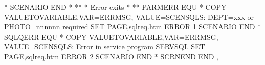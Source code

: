 \documentclass[letterpaper,10pt,english]{sphinxmanual}
\begin{document}
\begin{sphinxVerbatim}[commandchars=\\\{\}]
*
   SCENARIO END
*
*\PYGZhy{}\PYGZhy{}\PYGZhy{}\PYGZhy{}\PYGZhy{}\PYGZhy{}\PYGZhy{}\PYGZhy{}\PYGZhy{}\PYGZhy{}\PYGZhy{}\PYGZhy{}\PYGZhy{}\PYGZhy{}\PYGZhy{}\PYGZhy{}\PYGZhy{}\PYGZhy{}\PYGZhy{}\PYGZhy{}\PYGZhy{}\PYGZhy{}\PYGZhy{}\PYGZhy{}\PYGZhy{}\PYGZhy{}\PYGZhy{}\PYGZhy{}\PYGZhy{}\PYGZhy{}\PYGZhy{}\PYGZhy{}\PYGZhy{}\PYGZhy{}\PYGZhy{}\PYGZhy{}\PYGZhy{}\PYGZhy{}\PYGZhy{}\PYGZhy{}\PYGZhy{}\PYGZhy{}\PYGZhy{}\PYGZhy{}\PYGZhy{}\PYGZhy{}\PYGZhy{}\PYGZhy{}\PYGZhy{}\PYGZhy{}\PYGZhy{}\PYGZhy{}\PYGZhy{}\PYGZhy{}\PYGZhy{}\PYGZhy{}\PYGZhy{}\PYGZhy{}\PYGZhy{}\PYGZhy{}\PYGZhy{}\PYGZhy{}\PYGZhy{}\PYGZhy{}\PYGZhy{}\PYGZhy{}\PYGZhy{}\PYGZhy{}\PYGZhy{}*
* Error exits                                                         *
*\PYGZhy{}\PYGZhy{}\PYGZhy{}\PYGZhy{}\PYGZhy{}\PYGZhy{}\PYGZhy{}\PYGZhy{}\PYGZhy{}\PYGZhy{}\PYGZhy{}\PYGZhy{}\PYGZhy{}\PYGZhy{}\PYGZhy{}\PYGZhy{}\PYGZhy{}\PYGZhy{}\PYGZhy{}\PYGZhy{}\PYGZhy{}\PYGZhy{}\PYGZhy{}\PYGZhy{}\PYGZhy{}\PYGZhy{}\PYGZhy{}\PYGZhy{}\PYGZhy{}\PYGZhy{}\PYGZhy{}\PYGZhy{}\PYGZhy{}\PYGZhy{}\PYGZhy{}\PYGZhy{}\PYGZhy{}\PYGZhy{}\PYGZhy{}\PYGZhy{}\PYGZhy{}\PYGZhy{}\PYGZhy{}\PYGZhy{}\PYGZhy{}\PYGZhy{}\PYGZhy{}\PYGZhy{}\PYGZhy{}\PYGZhy{}\PYGZhy{}\PYGZhy{}\PYGZhy{}\PYGZhy{}\PYGZhy{}\PYGZhy{}\PYGZhy{}\PYGZhy{}\PYGZhy{}\PYGZhy{}\PYGZhy{}\PYGZhy{}\PYGZhy{}\PYGZhy{}\PYGZhy{}\PYGZhy{}\PYGZhy{}\PYGZhy{}\PYGZhy{}*
PARMERR  EQU   *
   COPY\PYGZdl{} VALUE\PYGZhy{}TO\PYGZhy{}VARIABLE,VAR=\PYGZsq{}\PYGZdl{}ERRMSG\PYGZdl{}\PYGZsq{},                       \PYGZhy{}
         VALUE=\PYGZsq{}SCENSQLS: DEPT=xxx or PHOTO=nnnnnn required\PYGZsq{}
   SET\PYGZdl{}  PAGE,\PYGZsq{}sqlreq.htm\PYGZsq{}
   ERROR\PYGZdl{} 1
   SCENARIO END
*
SQLQERR  EQU   *
   COPY\PYGZdl{} VALUE\PYGZhy{}TO\PYGZhy{}VARIABLE,VAR=\PYGZsq{}ERRMSG\PYGZsq{},                         \PYGZhy{}
         VALUE=\PYGZsq{}SCENSQLS: Error in service program SERVSQL\PYGZsq{}
   SET\PYGZdl{}  PAGE,\PYGZsq{}sqlreq.htm\PYGZsq{}
   ERROR\PYGZdl{} 2
   SCENARIO END
*
   SCRNEND
   END    ,
\end{sphinxVerbatim}



\renewcommand{\indexname}{Index}
\printindex
\end{document}
